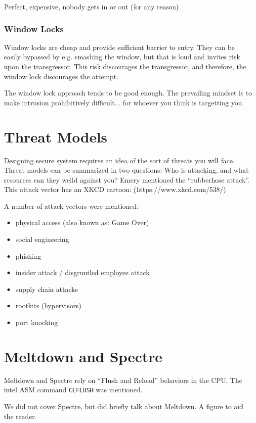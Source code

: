 \documentclass[twoside]{article}
\begin{document}
Perfect, expensive, nobody gets in or out (for any reason)

\subsubsection*{Window Locks}

Window locks are cheap and provide sufficient barrier to entry. They can be easily bypassed by e.g. smashing the window, but that is loud and invites risk upon the transgressor. This risk discourages the transgressor, and therefore, the window lock discourages the attempt.

The window lock approach tends to be good enough. The prevailing mindset is to make intrusion prohibitively difficult... for whoever you think is targetting you.

\section{Threat Models}

Designing secure system requires an idea of the sort of threats you will face. Threat models can be summarized in two questions: Who is attacking, and what resources can they weild against you? Emery mentioned the ``rubberhose attack''. This attack vector has an XKCD cartoon: \hyperref[xkcd](https://www.xkcd.com/538/)

A number of attack vectors were mentioned:

\begin{itemize}
\item physical access (also known as: Game Over)
\item social engineering
\item phishing
\item insider attack / disgruntled employee attack
\item supply chain attacks
\item rootkits (hypervisors)
\item port knocking
\end{itemize}

\section{Meltdown and Spectre}

Meltdown and Spectre rely on ``Flush and Reload'' behaviors in the CPU. The intel ASM command \texttt{CLFLUSH} was mentioned.

We did not cover Spectre, but did briefly talk about Meltdown. A figure to aid the reader.
\end{document}
